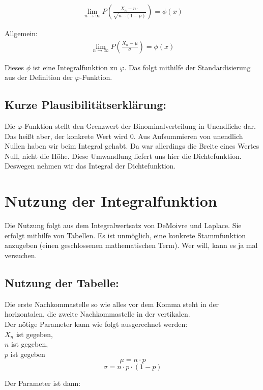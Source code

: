 \documentclass[12pt,a4paper,twocolumn]{article}
\begin{document}
\begin{eqnarray}
\lim\limits_{n \rightarrow \infty} P \left(\frac{X_n - n\cdotp}{\sqrt{n\cdotp\cdot(1 - p)}}\right) = \phi(x)
\end{eqnarray}

Allgemein:
\begin{eqnarray}
\lim\limits_{n \rightarrow \infty} P \left(\frac{X_n - \mu}{\sigma}\right) = \phi(x)
\end{eqnarray}

Dieses $\phi$ ist eine Integralfunktion zu $\varphi$. Das folgt mithilfe der Standardisierung aus der Definition der $\varphi$-Funktion. 

\subsection{Kurze Plausibilitätserklärung:}

Die $\varphi$-Funktion stellt den Grenzwert der Binominalverteilung in Unendliche dar. Das heißt aber, der konkrete Wert wird 0. Aus Aufsummieren von unendlich Nullen haben wir beim Integral gehabt. Da war allerdings die Breite eines Wertes Null, nicht die \glqq Höhe\grqq. Diese Umwandlung liefert uns hier die Dichtefunktion. Deswegen nehmen wir das Integral der Dichtefunktion.

\section{Nutzung der Integralfunktion}
Die Nutzung folgt aus dem Integralwertsatz von DeMoivre und Laplace. Sie erfolgt mithilfe von Tabellen. Es ist unmöglich, eine konkrete Stammfunktion anzugeben (einen geschlossenen mathematischen Term). Wer will, kann es ja mal versuchen.
\subsection{Nutzung der Tabelle:}

Die erste Nachkommastelle so wie alles vor dem Komma steht in der horizontalen, die zweite Nachkommastelle in der vertikalen. 
\\
Der nötige Parameter kann wie folgt ausgerechnet werden:\\
{\center $X_n$ ist gegeben,\\
$n$ ist gegeben,\\
$p$ ist gegeben\\}
$$
\mu = n \cdot p
$$
$$
\sigma = n \cdot p \cdot (1 - p)$$


Der Parameter ist dann:
\end{document}
